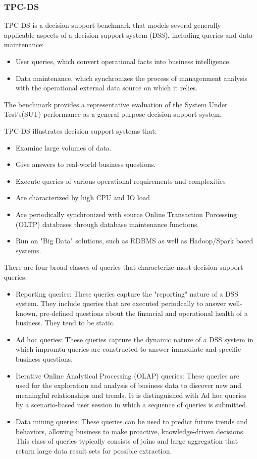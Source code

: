 \subsubsection{TPC-DS}
{\justify
TPC-DS \cite{TPC} is a decision support benchmark that models several generally applicable aspects of a decision support system (DSS), including queries and data maintenance:
\begin{itemize}
\item User queries, which convert operational facts into business intelligence.
\item Data maintenance, which synchronizes the process of managenment analysis with the operational external data source on which it relies.
\end{itemize}
The benchmark provides a representative evaluation of the System Under Test's(SUT) performance as a general purpose decision support system.
\par }
{\justify
TPC-DS illustrates decision support systems that:
\begin{itemize}
\item Examine large volumes of data.
\item Give answers to real-world business questions.
\item Execute queries of various operational requirements and complexities
\item Are characterized by high CPU and IO load
\item Are periodically synchronized with source Online Transaction Porcessing (OLTP) databases through database maintenance functions.
\item Run on "Big Data" solutions, such as RDBMS as well as Hadoop/Spark based systems.
\end{itemize}
\par }
{\justify
There are four broad classes of queries that characterize most decision support queries:
\begin{itemize}
\item Reporting queries: These queries capture the "reporting" nature of a DSS system. They include queries that are executed periodcally to answer well-known, pre-defined questions about the financial and operational health of a business. They tend to be static.
\item Ad hoc queries: These queries capture the dynamic nature of a DSS system in which impromtu queries are constructed to answer immediate and specific business questions.
\item Iterative Online Analytical Processing (OLAP) queries: These queries are used for the exploration and analysis of business data to discover new and meaningful relationships and trends. It is distinguished with Ad hoc queries by a scenario-based user session in which a sequence of queries is submitted.
\item Data mining queries: These queries can be used to predict future trends and behaviors, allowing business to make proactive, knowledge-driven decisions. This class of queries typically consists of joins and large aggregation that return large data result sets for possible extraction.
\end{itemize}
\par }

